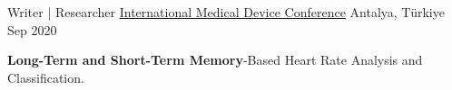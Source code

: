 \begin{cventries}
  \cventry
    {Writer | Researcher} %
{\underline{\href{https://drive.google.com/file/d/1ZHOTCGskb33IGZGYQ3Ekqhd1twpte5GM/view?usp=sharing}{International Medical Device Conference}}} %
    {Antalya, Türkiye} %
    {Sep 2020} %
    {
      \begin{cvitems} %
        \item {\textbf{Long-Term and Short-Term Memory}-Based Heart Rate Analysis and Classification.}
      \end{cvitems}
    }

\end{cventries}
